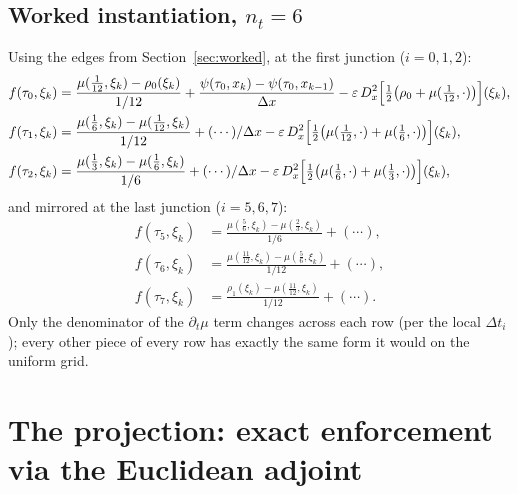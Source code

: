 \documentclass[11pt]{article}
\newcommand{\eps}{\varepsilon}
\newcommand{\dx}{\Delta x}
\begin{document}
\subsection{Worked instantiation, $n_t=6$}

Using the edges from Section~\ref{sec:worked}, at the first junction ($i=0,1,2$):
\begin{align}
  f(\tau_0,\xi_k) &= \frac{\mu(\tfrac1{12},\xi_k)-\rho_0(\xi_k)}{1/12}
    + \frac{\psi(\tau_0,x_k)-\psi(\tau_0,x_{k-1})}{\dx}
    - \eps\, D_x^2\Bigl[\tfrac12\bigl(\rho_0+\mu(\tfrac1{12},\cdot)\bigr)\Bigr](\xi_k), \\
  f(\tau_1,\xi_k) &= \frac{\mu(\tfrac16,\xi_k)-\mu(\tfrac1{12},\xi_k)}{1/12}
    + (\cdots)/\dx
    - \eps\, D_x^2\Bigl[\tfrac12\bigl(\mu(\tfrac1{12},\cdot)+\mu(\tfrac16,\cdot)\bigr)\Bigr](\xi_k), \\
  f(\tau_2,\xi_k) &= \frac{\mu(\tfrac13,\xi_k)-\mu(\tfrac16,\xi_k)}{1/6}
    + (\cdots)/\dx
    - \eps\, D_x^2\Bigl[\tfrac12\bigl(\mu(\tfrac16,\cdot)+\mu(\tfrac13,\cdot)\bigr)\Bigr](\xi_k),
\end{align}
and mirrored at the last junction ($i=5,6,7$):
\begin{align}
  f(\tau_5,\xi_k) &= \frac{\mu(\tfrac56,\xi_k)-\mu(\tfrac23,\xi_k)}{1/6} + (\cdots), \\
  f(\tau_6,\xi_k) &= \frac{\mu(\tfrac{11}{12},\xi_k)-\mu(\tfrac56,\xi_k)}{1/12} + (\cdots), \\
  f(\tau_7,\xi_k) &= \frac{\rho_1(\xi_k)-\mu(\tfrac{11}{12},\xi_k)}{1/12} + (\cdots).
\end{align}
Only the denominator of the $\partial_t\mu$ term changes across each row (per the local
$\Delta t_i$); every other piece of every row has exactly the same form it would on the
uniform grid.

\section{The projection: exact enforcement via the Euclidean adjoint}
\label{sec:projection}
\end{document}
